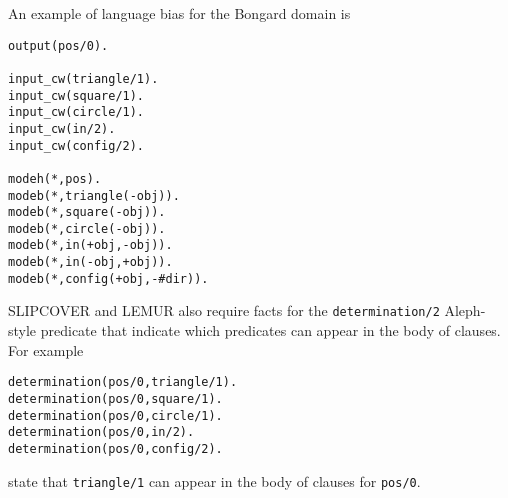 An example of language bias for the Bongard domain is
\begin{verbatim}
output(pos/0).

input_cw(triangle/1).
input_cw(square/1).
input_cw(circle/1).
input_cw(in/2).
input_cw(config/2).

modeh(*,pos).
modeb(*,triangle(-obj)).
modeb(*,square(-obj)).
modeb(*,circle(-obj)).
modeb(*,in(+obj,-obj)).
modeb(*,in(-obj,+obj)).
modeb(*,config(+obj,-#dir)).
\end{verbatim}
SLIPCOVER and LEMUR also require facts for the \verb|determination/2| Aleph-style predicate that indicate which predicates can appear in the body of clauses. 
For example
\begin{verbatim}
determination(pos/0,triangle/1).
determination(pos/0,square/1).
determination(pos/0,circle/1).
determination(pos/0,in/2).
determination(pos/0,config/2).
\end{verbatim}
state that \verb|triangle/1| can appear in the body of clauses for \verb|pos/0|.

